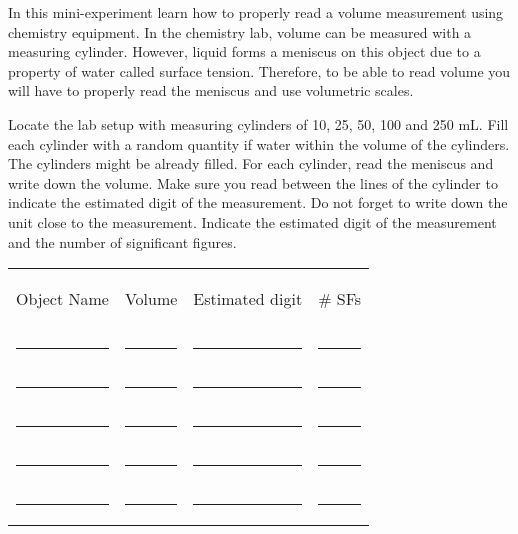 \documentclass[main.tex]{subfiles}
\begin{document}
\vspace{0.2cm}{\large \bfseries 3. Measuring volume}
In this mini-experiment learn how to properly read a volume measurement using chemistry equipment. In the chemistry lab, volume can be measured with a measuring cylinder. However, liquid forms a meniscus on this object due to a property of water called surface tension. Therefore, to be able to read volume you will have to properly read the meniscus and use volumetric scales.
\begin{steps}
    \newstep[] Locate the lab setup with measuring cylinders of 10, 25, 50, 100 and 250 mL.
        \newstep[]  Fill each cylinder with a random quantity if water within the volume of the cylinders. The cylinders might be already filled.
        \newstep[]  For each cylinder, read the meniscus and write down the volume. Make sure you read between the lines of the cylinder to indicate the estimated digit of the measurement. Do not forget to write down the unit close to the measurement.
         \newstep[] Indicate the estimated digit of the measurement and the number of significant figures.     
\end{steps}

\begin{center} \begin{tabular}{ p{5cm} p{3cm} p{3cm}p{3cm}   }
   \begin{bf}Object Name\end{bf} & \begin{bf}Volume\end{bf} &\begin{bf}Estimated digit\end{bf} &\begin{bf}\# SFs\end{bf} \\[0.1cm]     
  \rule{5cm}{0.4pt} 				&\rule{3cm}{0.4pt}&\rule{3cm}{0.4pt}&\rule{1cm}{0.4pt}  \\[0.3cm]      
  \rule{5cm}{0.4pt} 				&\rule{3cm}{0.4pt}&\rule{3cm}{0.4pt}&\rule{1cm}{0.4pt}  \\[0.3cm]      
  \rule{5cm}{0.4pt} 				&\rule{3cm}{0.4pt}&\rule{3cm}{0.4pt}&\rule{1cm}{0.4pt}  \\[0.3cm]      
  \rule{5cm}{0.4pt} 				&\rule{3cm}{0.4pt}&\rule{3cm}{0.4pt}&\rule{1cm}{0.4pt}  \\[0.3cm]      
  \rule{5cm}{0.4pt} 				&\rule{3cm}{0.4pt}&\rule{3cm}{0.4pt}&\rule{1cm}{0.4pt}  \\[0.3cm]      
 \end{tabular}\end{center}
\end{document}
